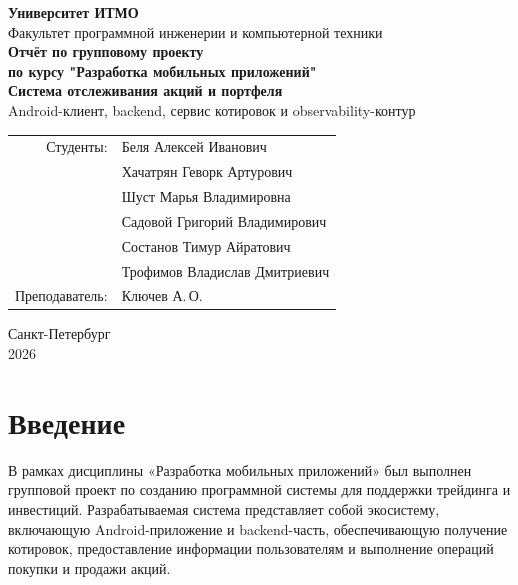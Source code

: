 \documentclass[12pt,a4paper]{article}
\begin{document}
\begin{titlepage}
    \begin{center}
        \textbf{Университет ИТМО}\\
        Факультет программной инженерии и компьютерной техники\\[2cm]

        \textbf{\Large Отчёт по групповому проекту}\\[0.3cm]
        \textbf{\large по курсу "Разработка мобильных приложений"}\\[1.4cm]

        \textbf{\Large Система отслеживания акций и портфеля}\\[0.4cm]
        Android-клиент, backend, сервис котировок и observability-контур\\[2cm]
    \end{center}

    \begin{flushright}
        \begin{tabular}{rl}
            Студенты: & Беля Алексей Иванович \\
            & Хачатрян Геворк Артурович \\
            & Шуст Марья Владимировна \\
            & Садовой Григорий Владимирович \\
            & Состанов Тимур Айратович \\
            & Трофимов Владислав Дмитриевич \\
            Преподаватель: & Ключев А.\,О. \\
        \end{tabular}
    \end{flushright}

    \vfill

    \begin{center}
        Санкт-Петербург\\
        2026
    \end{center}
\end{titlepage}

\tableofcontents
\newpage

\section*{Введение}

В рамках дисциплины «Разработка мобильных приложений» был выполнен групповой проект по созданию программной системы для поддержки трейдинга и инвестиций. Разрабатываемая система представляет собой экосистему, включающую Android-приложение и backend-часть, обеспечивающую получение котировок, предоставление информации пользователям и выполнение операций покупки и продажи акций.
\end{document}
